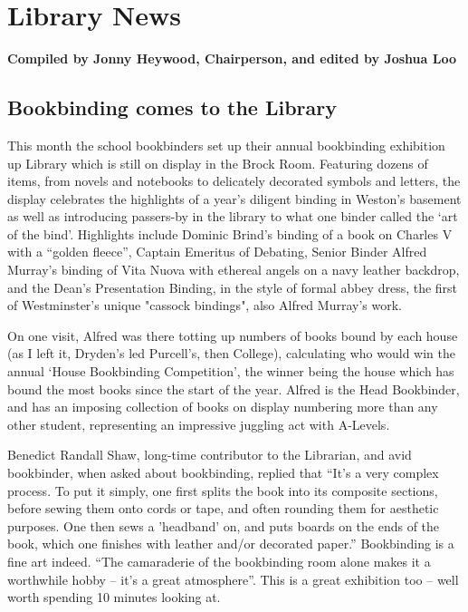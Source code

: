 \documentclass[10pt,a4paper]{article}
\begin{document}


\section{Library News}

\textbf{Compiled by Jonny Heywood, Chairperson, and edited by Joshua Loo}

\begin{multicols}{2}

\subsection{Bookbinding comes to the Library}

This month the school bookbinders set up their annual bookbinding exhibition up Library which is still on display in the Brock Room. Featuring dozens of items, from novels and notebooks to delicately decorated symbols and letters, the display celebrates the highlights of a year’s diligent binding in Weston’s basement as well as introducing passers-by in the library to what one binder called the ‘art of the bind’. Highlights include Dominic Brind’s binding of a book on Charles V with a “golden fleece”, Captain Emeritus of Debating, Senior Binder Alfred Murray’s binding of Vita Nuova with ethereal angels on a navy leather backdrop, and the Dean's Presentation Binding, in the style of formal abbey dress, the first of Westminster's unique "cassock bindings", also Alfred Murray’s work. 

On one visit, Alfred was there totting up numbers of books bound by each house (as I left it, Dryden’s led Purcell’s, then College), calculating who would win the annual ‘House Bookbinding Competition’, the winner being the house which has bound the most books since the start of the year. Alfred is the Head Bookbinder, and has an imposing collection of books on display numbering more than any other student, representing an impressive juggling act with A-Levels. 

Benedict Randall Shaw, long-time contributor to the Librarian, and avid bookbinder, when asked about bookbinding, replied that “It’s a very complex process. To put it simply, one first splits the book into its composite sections, before sewing them onto cords or tape, and often rounding them for aesthetic purposes. One then sews a 'headband' on, and puts boards on the ends of the book, which one finishes with leather and/or decorated paper.” Bookbinding is a fine art indeed. “The camaraderie of the bookbinding room alone makes it a worthwhile hobby – it’s a great atmosphere”. This is a great exhibition too – well worth spending 10 minutes looking at.


\end{multicols}
\end{document}
